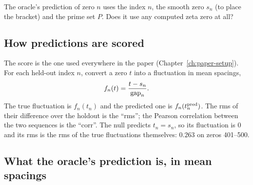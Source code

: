 \begin{checkpoint}
The oracle's prediction of zero $n$ uses the index $n$, the smooth zero $s_n$ (to place the bracket) and the prime set $P$. Does it use any computed zeta zero at all?
\end{checkpoint}

\subsection{How predictions are scored}

The score is the one used everywhere in the paper (Chapter~\ref{ch:paper-setup}). For each held-out index $n$, convert a zero $t$ into a fluctuation in mean spacings,
\begin{equation}
f_n(t) = \frac{t-s_n}{\mathrm{gap}_n} .
\label{eq:paper-arithmetic-fluct}
\end{equation}
The true fluctuation is $f_n(t_n)$ and the predicted one is $f_n(t_n^{\rm pred})$. The rms of their difference over the holdout is the ``rms''; the Pearson correlation between the two sequences is the ``corr''. The null predicts $t_n=s_n$, so its fluctuation is $0$ and its rms is the rms of the true fluctuations themselves: $0.263$ on zeros 401--500.

\subsection{What the oracle's prediction is, in mean spacings}

